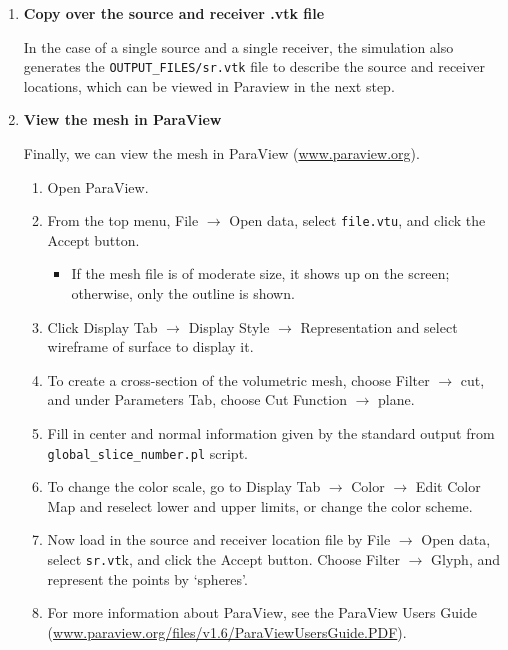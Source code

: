 \documentclass[oneside,english]{book}
\newenvironment{lyxcode}
{\begin{list}{}{
\setlength{\rightmargin}{\leftmargin}
\setlength{\listparindent}{0pt}%
\raggedright
\setlength{\itemsep}{0pt}
\setlength{\parsep}{0pt}
\normalfont\ttfamily}%
 \item[]}
{\end{list}}
\newcommand{\urlwithparentheses}[1]{(\url{#1})}
\begin{document}
\begin{enumerate}
\item \textbf{Copy over the source and receiver .vtk file}


In the case of a single source and a single receiver, the simulation
also generates the \texttt{OUTPUT\_FILES/sr.vtk} file to describe
the source and receiver locations, which can be viewed in Paraview
in the next step.

\item \textbf{View the mesh in ParaView}


Finally, we can view the mesh in ParaView \urlwithparentheses{www.paraview.org}.

\begin{enumerate}
\item Open ParaView.
\item From the top menu, \textsf{File} $\rightarrow$\textsf{ Open data},
select \texttt{file.vtu}, and click the \textsf{Accept} button.

\begin{itemize}
\item If the mesh file is of moderate size, it shows up on the screen; otherwise,
only the outline is shown.
\end{itemize}
\item Click \textsf{Display Tab} $\rightarrow$ \textsf{Display Style} $\rightarrow$
\textsf{Representation} and select \textsf{wireframe of surface} to
display it.
\item To create a cross-section of the volumetric mesh, choose \textsf{Filter}
$\rightarrow$ \textsf{cut}, and under \textsf{Parameters Tab}, choose
\textsf{Cut Function} $\rightarrow$ \textsf{plane}.
\item Fill in center and normal information given by the standard output
from \texttt{global\_slice\_number.pl} script.
\item To change the color scale, go to \textsf{Display Tab} $\rightarrow$
\textsf{Color} $\rightarrow$ \textsf{Edit Color Map} and reselect
lower and upper limits, or change the color scheme.
\item Now load in the source and receiver location file by \textsf{File}
$\rightarrow$\textsf{ Open data}, select \texttt{sr.vt}k, and click
the \textsf{Accept} button. Choose \textsf{Filter} $\rightarrow$\textsf{
Glyph}, and represent the points by `\textsf{spheres}'.
\item For more information about ParaView, see the ParaView Users Guide \urlwithparentheses{www.paraview.org/files/v1.6/ParaViewUsersGuide.PDF}.
\end{enumerate}
\end{enumerate}
\end{document}
